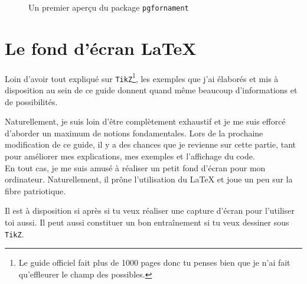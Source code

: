 \begin{figure}[H]
\centering
{}
\caption{Un premier aperçu du package \texttt{pgfornament}}
\end{figure}

\section{Le fond d'écran \LaTeX{}}

Loin d'avoir tout expliqué sur \texttt{TikZ}\footnote{Le guide officiel fait plus de 1000 pages donc tu penses bien que je n'ai fait qu'effleurer le champ des possibles.}, les exemples que j'ai élaborés et mis à disposition au sein de ce guide donnent quand même beaucoup d'informations et de possibilités.

Naturellement, je suis loin d'être complètement exhaustif et je me suis efforcé d'aborder un maximum de notions fondamentales. Lors de la prochaine modification de ce guide, il y a des chances que je revienne sur cette partie, tant pour améliorer mes explications, mes exemples et l'affichage du code. \\

En tout cas, je me suis amusé à réaliser un petit fond d'écran pour mon ordinateur. Naturellement, il prône l'utilisation du \LaTeX{} et joue un peu sur la fibre patriotique.

Il est à disposition si après si tu veux réaliser une capture d'écran pour l'utiliser toi aussi. Il peut aussi constituer un bon entraînement si tu veux dessiner sous \texttt{TikZ}.

\newpage

